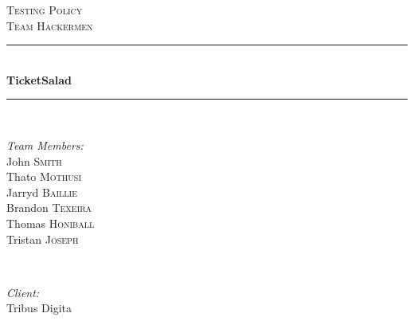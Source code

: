 \documentclass[12pt]{article}
\begin{document}
	
	\begin{titlepage}
	
	\newcommand{\HRule}{\rule{\linewidth}{0.5mm}} %
	
	\center %
	 
	
	\textsc{\LARGE Testing Policy}\\[0.5cm] %
	\textsc{\Large Team Hackermen}\\[0.5cm] %
	
	
	
	\HRule \\[0.4cm]
	{ \huge \bfseries TicketSalad}\\[0.4cm] %
	\HRule \\[1.5cm]
	 
	
	\begin{minipage}{0.4\textwidth}
	\begin{flushleft} \large
	\emph{Team Members:}\\
	John \textsc{Smith} \\%
	Thato \textsc{Mothusi}\\
	Jarryd \textsc{Baillie}\\
	Brandon \textsc{Texeira}\\
	Thomas \textsc{Honiball}\\
	Tristan \textsc{Joseph}\\
	\end{flushleft}
	\end{minipage}
	~
	\begin{minipage}{0.4\textwidth}
	\begin{flushright} \large
	\emph{Client:} \\
	Tribus Digita %
	\end{flushright}
	\end{minipage}\\[2cm]
	

\end{titlepage}
\end{document}
